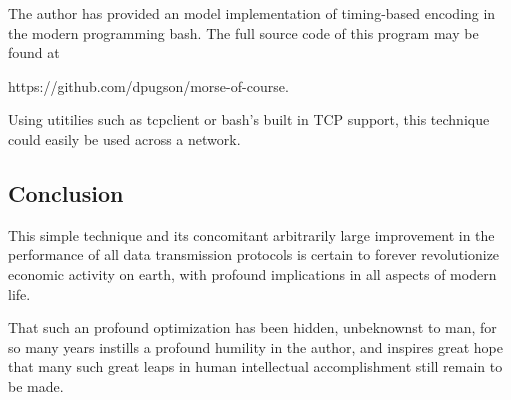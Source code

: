 \documentclass[sigplan]{acmart}
\begin{document}
The author has provided an model implementation
of timing-based encoding in the modern programming
bash. The full source code of this program may be
found at

https://github.com/dpugson/morse-of-course.

Using utitilies such as tcpclient or bash's built in TCP support,
this technique could easily be used across a network.

\subsection{Conclusion}

This simple technique and its concomitant arbitrarily large improvement
in the performance of all data transmission protocols is certain to
forever revolutionize economic activity on earth, with profound
implications in all aspects of modern life.

That such an profound optimization has been hidden, unbeknownst
to man, for so many years instills a profound humility in the author,
and inspires great hope that many such great leaps in human
intellectual accomplishment still remain to be made.



\end{document}
